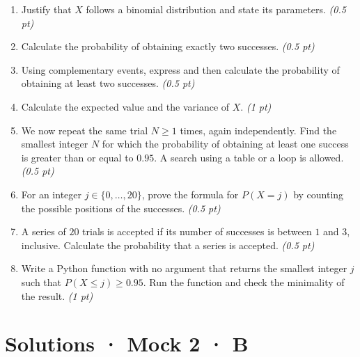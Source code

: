 \begin{enumerate}

\item Justify that $X$ follows a binomial distribution and state its parameters. \hfill\textit{(0.5 pt)}

\item Calculate the probability of obtaining exactly two successes. \hfill\textit{(0.5 pt)}

\item Using complementary events, express and then calculate the probability of obtaining at least two successes. \hfill\textit{(0.5 pt)}

\item Calculate the expected value and the variance of $X$. \hfill\textit{(1 pt)}

\item We now repeat the same trial $N\ge1$ times, again independently. Find the smallest integer $N$ for which the probability of obtaining at least one success is greater than or equal to $0.95$. A search using a table or a loop is allowed. \hfill\textit{(0.5 pt)}

\item For an integer $j\in\{0,\ldots,20\}$, prove the formula for $P(X=j)$ by counting the possible positions of the successes. \hfill\textit{(0.5 pt)}

\item A series of $20$ trials is accepted if its number of successes is between $1$ and $3$, inclusive. Calculate the probability that a series is accepted. \hfill\textit{(0.5 pt)}

\item Write a Python function with no argument that returns the smallest integer $j$ such that $P(X\le j)\ge0.95$. Run the function and check the minimality of the result. \hfill\textit{(1 pt)}

\end{enumerate}

\ifprof\clearpage

\section*{Solutions · Mock 2 · B}\label{cor:8-4}

